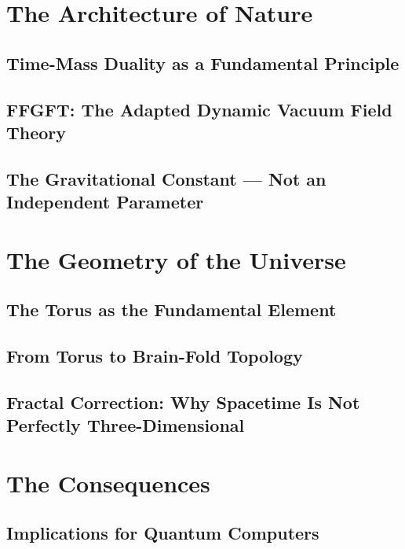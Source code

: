 \documentclass[11pt,twoside,openright]{book}
\begin{document}
\part{The Architecture of Nature}

\chapter{Time-Mass Duality as a Fundamental Principle}\label{ch:tm}


\chapter{FFGFT: The Adapted Dynamic Vacuum Field Theory}\label{ch:ffgft}


\chapter{The Gravitational Constant --- Not an Independent Parameter}\label{ch:grav}


\part{The Geometry of the Universe}

\chapter{The Torus as the Fundamental Element}\label{ch:torus}


\chapter{From Torus to Brain-Fold Topology}\label{ch:hirn}


\chapter{Fractal Correction: Why Spacetime Is Not Perfectly Three-Dimensional}\label{ch:fraktal}


\part{The Consequences}

\chapter{Implications for Quantum Computers}\label{ch:qc}

\end{document}
